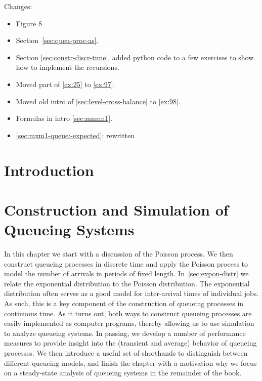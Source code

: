 \author{Nicky D. van  Foreest}


\frontmatter
\maketitle

Changes:
\begin{itemize}
\item Figure 8
\item Section~\ref{sec:queu-proc-as}.
\item Section \ref{sec:constr-discr-time}, added python code to a few exercises to show how to implement the recursions.
\item Moved part of \cref{ex:25} to \cref{ex:97}.
\item Moved old intro of \cref{sec:level-cross-balance} to \cref{ex:98}.
\item Formulas in intro \cref{sec:mnmn1}.
\item \cref{sec:mxm1-queue:-expected}: rewritten
\end{itemize}


\tableofcontents

\chapter{Introduction}
\label{cha:introduction}



\mainmatter

\chapter{Construction and Simulation of Queueing Systems}
\label{cha:single-stat-queu}

In this chapter we start with a discussion of the Poisson process.
We then construct queueing processes in discrete time and apply the Poisson process to model the number of arrivals in periods of fixed length.
In~\cref{sec:expon-distr} we relate the exponential distribution to the Poisson distribution.
The exponential distribution often serves as a good model for inter-arrival times of individual jobs.
As such, this is a key component of the construction of queueing processes in continuous time.
As it turns out, both ways to construct queueing processes are easily implemented as computer programs, thereby allowing us to use simulation to analyze queueing systems.
In passing, we develop a number of performance measures to provide insight into the (transient and average) behavior of queueing processes.
We then introduce a useful set of shorthands to distinguish between different queueing models, and finish the chapter with a motivation why we focus on a steady-state analysis of queueing systems in the remainder of the book.

